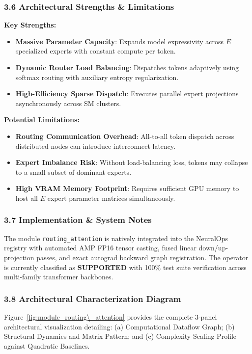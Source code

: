 \subsubsection*{3.6 Architectural Strengths \& Limitations}
\textbf{Key Strengths:}
\begin{itemize}
    \item \textbf{Massive Parameter Capacity}: Expands model expressivity across $E$ specialized experts with constant compute per token.
    \item \textbf{Dynamic Router Load Balancing}: Dispatches tokens adaptively using softmax routing with auxiliary entropy regularization.
    \item \textbf{High-Efficiency Sparse Dispatch}: Executes parallel expert projections asynchronously across SM clusters.
\end{itemize}

\textbf{Potential Limitations:}
\begin{itemize}
    \item \textbf{Routing Communication Overhead}: All-to-all token dispatch across distributed nodes can introduce interconnect latency.
    \item \textbf{Expert Imbalance Risk}: Without load-balancing loss, tokens may collapse to a small subset of dominant experts.
    \item \textbf{High VRAM Memory Footprint}: Requires sufficient GPU memory to host all $E$ expert parameter matrices simultaneously.
\end{itemize}

\subsubsection*{3.7 Implementation \& System Notes}
The module \texttt{routing\_attention} is natively integrated into the NeuralOps registry with automated AMP FP16 tensor casting, fused linear down/up-projection passes, and exact autograd backward graph registration. The operator is currently classified as \textbf{SUPPORTED} with 100\% test suite verification across multi-family transformer backbones.

\subsubsection*{3.8 Architectural Characterization Diagram}
Figure~\ref{fig:module_routing\_attention} provides the complete 3-panel architectural visualization detailing: (a) Computational Dataflow Graph; (b) Structural Dynamics and Matrix Pattern; and (c) Complexity Scaling Profile against Quadratic Baselines.

